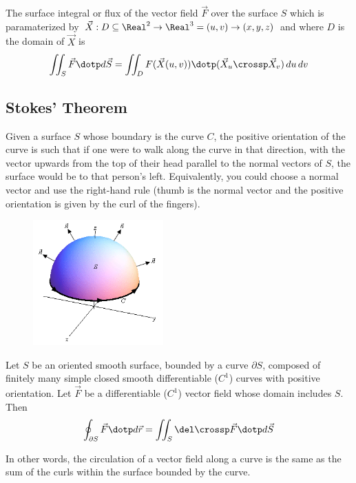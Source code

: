 \begin{definition}
  The surface integral or flux of the vector field $\vec{F}$ over the surface $S$ which is paramaterized by $\vec{X} : D \subseteq \Real^2 \to \Real^3 = (u, v) \to (x, y, z)$ and where $D$ is the domain of $\vec{X}$ is
  \[
    \iint_S \vec{F} \dotp d\vec{S} = \iint_D F(\vec{X}(u, v)) \dotp (\vec{X}_u \crossp \vec{X}_v) \,du \, dv
  \]
\end{definition}

\subsection{Stokes' Theorem}

\begin{definition}
  Given a surface $S$ whose boundary is the curve $C$, the positive orientation of the curve is such that if one were to walk along the curve in that direction, with the vector upwards from the top of their head parallel to the normal vectors of $S$, the surface would be to that person's left. Equivalently, you could choose a normal vector and use the right-hand rule (thumb is the normal vector and the positive orientation is given by the curl of the fingers).

  \begin{figure}[H]
    \centering
    \includegraphics[width=50mm]{content/mvc/images/positive-oriented-boundary.png}
  \end{figure}
\end{definition}

\begin{namedtheorem}
  Let $S$ be an oriented smooth surface, bounded by a curve $\partial S$, composed of finitely many simple closed smooth differentiable ($C^1$) curves with positive orientation. Let $\vec{F}$ be a differentiable ($C^1$) vector field whose domain includes $S$. Then
  \[
    \oint_{\partial S} \vec{F} \dotp d\vec{r} = \iint_S \del \crossp \vec{F} \dotp d\vec{S}
  \]

  In other words, the circulation of a vector field along a curve is the same as the sum of the curls within the surface bounded by the curve.
\end{namedtheorem}

